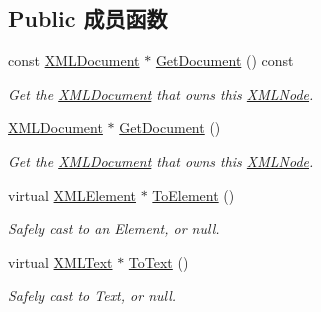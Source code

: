 \subsection*{Public 成员函数}
\begin{DoxyCompactItemize}
\item 
\mbox{\label{classtinyxml2_1_1_x_m_l_node_a2de84cfa4ec3fe249bad745069d145f1}} 
const \hyperlink{classtinyxml2_1_1_x_m_l_document}{X\+M\+L\+Document} $\ast$ \hyperlink{classtinyxml2_1_1_x_m_l_node_a2de84cfa4ec3fe249bad745069d145f1}{Get\+Document} () const
\begin{DoxyCompactList}\small\item\em Get the \hyperlink{classtinyxml2_1_1_x_m_l_document}{X\+M\+L\+Document} that owns this \hyperlink{classtinyxml2_1_1_x_m_l_node}{X\+M\+L\+Node}. \end{DoxyCompactList}\item 
\mbox{\label{classtinyxml2_1_1_x_m_l_node_af343d1ef0b45c0020e62d784d7e67a68}} 
\hyperlink{classtinyxml2_1_1_x_m_l_document}{X\+M\+L\+Document} $\ast$ \hyperlink{classtinyxml2_1_1_x_m_l_node_af343d1ef0b45c0020e62d784d7e67a68}{Get\+Document} ()
\begin{DoxyCompactList}\small\item\em Get the \hyperlink{classtinyxml2_1_1_x_m_l_document}{X\+M\+L\+Document} that owns this \hyperlink{classtinyxml2_1_1_x_m_l_node}{X\+M\+L\+Node}. \end{DoxyCompactList}\item 
\mbox{\label{classtinyxml2_1_1_x_m_l_node_aab516e699567f75cc9ab2ef2eee501e8}} 
virtual \hyperlink{classtinyxml2_1_1_x_m_l_element}{X\+M\+L\+Element} $\ast$ \hyperlink{classtinyxml2_1_1_x_m_l_node_aab516e699567f75cc9ab2ef2eee501e8}{To\+Element} ()
\begin{DoxyCompactList}\small\item\em Safely cast to an Element, or null. \end{DoxyCompactList}\item 
\mbox{\label{classtinyxml2_1_1_x_m_l_node_a41c55dab9162d1eb62db2008430e376b}} 
virtual \hyperlink{classtinyxml2_1_1_x_m_l_text}{X\+M\+L\+Text} $\ast$ \hyperlink{classtinyxml2_1_1_x_m_l_node_a41c55dab9162d1eb62db2008430e376b}{To\+Text} ()
\begin{DoxyCompactList}\small\item\em Safely cast to Text, or null. \end{DoxyCompactList}\item 

\end{DoxyCompactItemize}
